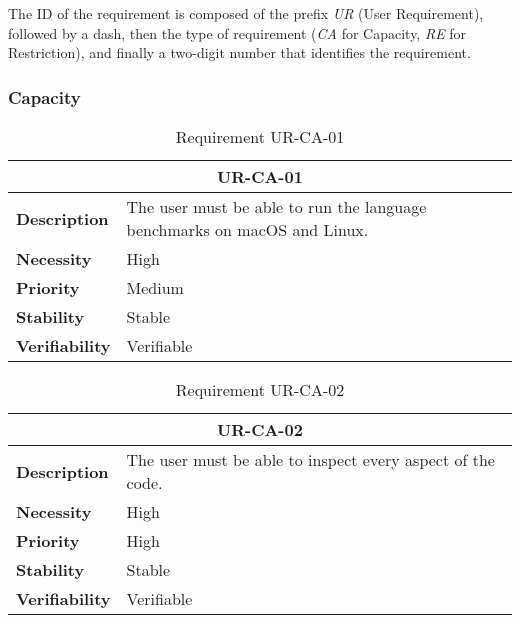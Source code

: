 The ID of the requirement is composed of the prefix \textit{UR} (User Requirement), followed by a dash, then the type of requirement (\textit{CA} for Capacity, \textit{RE} for Restriction), and finally a two-digit number that identifies the requirement.

\subsubsection{Capacity}

\begin{table}[H]
    \centering
    \begin{tabular}{l p{10cm}}
        \toprule
        \multicolumn{2}{c}{UR-CA-01} \\
        \toprule
        \textbf{Description}        &  The user must be able to run the language benchmarks on macOS and Linux.  \\
        \textbf{Necessity}          &  High   \\
        \textbf{Priority}           &  Medium   \\
        \textbf{Stability}          &  Stable   \\
        \textbf{Verifiability}       &  Verifiable \\
    \end{tabular}
    \caption{Requirement UR-CA-01}
    \label{tab:ur-ca-01}
\end{table}

\begin{table}[H]
    \centering
    \begin{tabular}{l p{10cm}}
        \toprule
        \multicolumn{2}{c}{UR-CA-02} \\
        \toprule
        \textbf{Description}        & The user must be able to inspect every aspect of the code. \\
        \textbf{Necessity}          & High  \\
        \textbf{Priority}           & High  \\
        \textbf{Stability}          & Stable \\
        \textbf{Verifiability}       & Verifiable \\
    \end{tabular}
    \caption{Requirement UR-CA-02}
    \label{tab:ur-ca-02}
\end{table}

